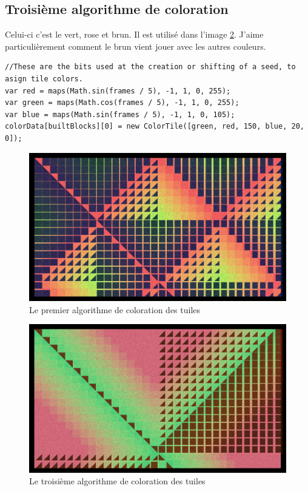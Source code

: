 \subsection{Troisième algorithme de coloration}
Celui-ci c'est le vert, rose et brun. Il est utilisé dans l'image \ref{thirdcoloralgorithm}. J'aime particulièrement comment le brun vient jouer avec les autres couleurs.
\begin{lstlisting}
//These are the bits used at the creation or shifting of a seed, to asign tile colors.
var red = maps(Math.sin(frames / 5), -1, 1, 0, 255);
var green = maps(Math.cos(frames / 5), -1, 1, 0, 255);
var blue = maps(Math.sin(frames / 5), -1, 1, 0, 105);
colorData[builtBlocks][0] = new ColorTile([green, red, 150, blue, 20, 0]);
\end{lstlisting}
\begin{figure}[h]
\includegraphics[width=1\textwidth]{images/pavage003.jpg}
\caption{Le premier algorithme de coloration des tuiles}
\label{thirdcoloralgorithm}
\end{figure}
\begin{figure}[h]
\includegraphics[width=1\textwidth]{images/pavage004.jpg}
\caption{Le troisième algorithme de coloration des tuiles}
\label{thirdcoloralgorithm}
\end{figure}
